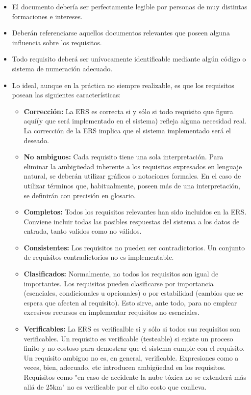 \documentclass[12pt,a4paper]{article}
\begin{document}
\begin{itemize}
\item El documento debería ser perfectamente legible por personas de muy
distintas formaciones e intereses.

\item Deberán referenciarse aquellos documentos relevantes que poseen
alguna influencia sobre los requisitos.

\item Todo requisito deberá ser unívocamente identificable mediante algún
código o sistema de numeración adecuado.

\item Lo ideal, aunque en la práctica no siempre realizable, es que los
requisitos posean las siguientes características: 

\begin{itemize}
\item \textbf{Corrección:} La ERS es correcta si y sólo si todo requisito que
figura aquí(y que será implementado en el sistema) refleja alguna
necesidad real. La corrección de la ERS implica que el sistema
implementado será el deseado.

\item \textbf{No ambiguos:} Cada requisito tiene una sola interpretación. Para
eliminar la ambigüedad inherente a los requisitos expresados en
lenguaje natural, se deberán utilizar gráficos o notaciones
formales. En el caso de utilizar términos que, habitualmente,
poseen más de una interpretación, se definirán con precisión en
glosario.

\item \textbf{Completos:} Todos los requisitos relevantes han sido incluidos en
la ERS. Conviene incluir todas las posibles respuestas del sistema
a los datos de entrada, tanto validos como no válidos.

\item \textbf{Consistentes:} Los requisitos no pueden ser contradictorios. Un
conjunto de requisitos contradictorios no es implementable.

\item \textbf{Clasificados:} Normalmente, no todos los requisitos son igual de
importantes. Los requisitos pueden clasificarse por importancia
(esenciales, condicionales u opcionales) o por estabilidad (cambios
que se espera que afecten al requisito). Esto sirve, ante todo,
para no emplear excesivos recursos en implementar requisitos no
esenciales.

\item \textbf{Verificables:} La ERS es verificalble si y sólo si todos sus
requisitos son verificables. Un requisito es verificable
(testeable) si existe un proceso finito y no costoso para
demostrar que el sistema cumple con el requisito. Un requisito
ambiguo no es, en general, verificable. Expresiones como a veces,
bien, adecuado, etc introducen ambigüedad en los
requisitos. Requisitos como "en caso de accidente la nube tóxica
no se extenderá más allá de 25km" no es verificable por el alto
costo que conlleva.


\end{itemize}
\end{itemize}
\end{document}
